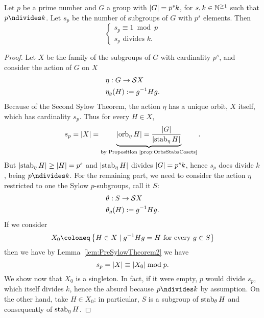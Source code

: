 \begin{proposition}\label{prop:SylowTheorem}
Let \(p\) be a prime number and  \(G\) a group with \(\left\lvert G\right\rvert = p^s k\), for \(s, k \in \mathbb N^{\ge 1}\) such that \(p \ndivides k\). Let \(s_p\) be the number of subgroups of \(G\) with \(p^s\) elements. Then
\[\begin{cases}
s_p \equiv 1 \bmod p \\
s_p \text{ divides } k .
\end{cases}\]
\end{proposition}

\begin{proof}
Let \(X\) be the family of the subgroups of \(G\) with cardinality \(p^s\), and consider the action of \(G\) on \(X\)
\begin{align*}
& \eta : G \to \mathcal S X\\
& \eta_g (H) := g^{-1} H g .
\end{align*}
Because of the Second Sylow Theorem, the action \(\eta\) has a unique orbit, \(X\) itself, which has cardinality \(s_p\). Thus for every \(H \in X\),
\[s_p = \left\lvert X\right\rvert = \underbrace{\left\lvert\operatorname{orb}_\eta H\right\rvert = \frac{\left\lvert G\right\rvert}{\left\lvert\operatorname{stab}_\eta H\right\rvert}}_{\text{by Proposition~\ref{prop:OrbsStabsCosets}}}.\]
But \(\left\lvert\operatorname{stab}_\eta H\right\rvert \ge \left\lvert H\right\rvert = p^s\) and \(\left\lvert\operatorname{stab}_\eta H\right\rvert\) divides \(\left\lvert G\right\rvert = p^s k\), hence \(s_p\) does divide \(k\), being \(p \ndivides k\). For the remaining part, we need to consider the action \(\eta\) restricted to one the Sylow \(p\)-subgroups, call it \(S\):
\begin{align*}
& \theta : S \to \mathcal S X\\
& \theta_g (H) := g^{-1} H g .
\end{align*}
If we consider
\[X_0 \coloneq \set{H \in X \mid \inv g H g = H \text{ for every } g \in S}\]
then we have by Lemma~\ref{lem:PreSylowTheorem2} we have
\[s_p = \left\lvert X\right\rvert \equiv \left\lvert X_0\right\rvert \bmod p .\]
We show now that \(X_0\) is a singleton. In fact, if it were empty, \(p\) would divide \(s_p\), which itself divides \(k\), hence the absurd because \(p \ndivides k\) by assumption. On the other hand, take \(H \in X_0\): in particular, \(S\) is a subgroup of \(\operatorname{stab}_\theta H\) and consequently of \(\operatorname{stab}_\eta H\). 
\end{proof}


